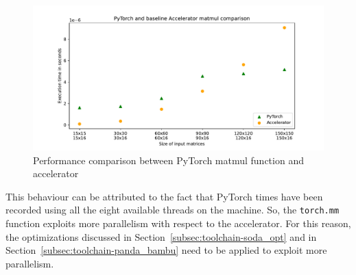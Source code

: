 
\begin{figure}[t]
    \centering
    \includegraphics[height=0.4\textwidth]{Images/matmul_comparison}
    \caption{Performance comparison between PyTorch matmul function and accelerator}
    \label{fig:pytorch-accelerator-comparison}
\end{figure}

This behaviour can be attributed to the fact that PyTorch times have been recorded using all the eight available threads on the machine.
So, the \lstinline{torch.mm} function exploits more parallelism with respect to the accelerator.
For this reason, the optimizations discussed in Section~\ref{subsec:toolchain-soda_opt} and in Section~\ref{subsec:toolchain-panda_bambu} need to be applied to exploit more parallelism.

